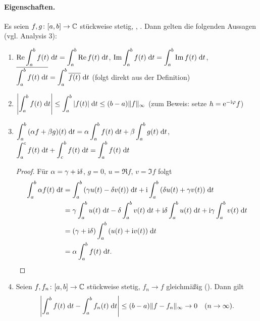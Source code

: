 \documentclass[a4paper,twoside,DIV15,BCOR12mm]{scrbook}
\begin{document}
\paragraph{Eigenschaften.} Es seien $f,g\colon[a,b]\to\mathbb{C}$ stückweise stetig, , \kmplx{\alpha,\beta}. Dann gelten die folgenden Aussagen (vgl. Analysis 3):
\begin{enumerate}
\item $\displaystyle \operatorname{Re}{\int_{a}^{b}{f(t)}\;\mathrm{d} t} = \int_{a}^{b}{\operatorname{Re}{f(t)}}\;\mathrm{d} t$, $\displaystyle \operatorname{Im}{\int_{a}^{b}{f(t)}\;\mathrm{d} t} = \int_{a}^{b}{\operatorname{Im}{f(t)}}\;\mathrm{d} t$, 
$\displaystyle \overline{\int_{a}^{b}{f(t)}\;\mathrm{d} t} = \int_{a}^{b}{\overline{f(t)}}\;\mathrm{d} t$ (folgt direkt aus der Definition)
\item $\displaystyle \left\lvert\int_{a}^{b}{f(t)}\;\mathrm{d} t\right\lvert \le \int_{a}^{b}{\left\lvert f(t)\right\lvert}\;\mathrm{d} t \le (b-a) \|f\|_\infty$ (zum Beweis: setze $h=\mathrm{e}^{-\mathrm{i}\varphi}f$)
\item $\displaystyle \int_{a}^{b}{(\alpha f + \beta g)(t)}\;\mathrm{d} t = \alpha \int_{a}^{b}{f(t)}\;\mathrm{d} t + \beta \int_{a}^{b}{g(t)}\;\mathrm{d} t$,
$\displaystyle \int_{a}^{c}{f(t)}\;\mathrm{d} t + \int_{c}^{b}{f(t)}\;\mathrm{d} t = \int_{a}^{b}{f(t)}\;\mathrm{d} t$
\begin{proof}
Für $\alpha = \gamma + \mathrm{i}\delta$, $g=0$, $u=\Re{f}$, $v=\Im{f}$ folgt
\begin{align*}
\int_{a}^{b}{\alpha f(t)}\;\mathrm{d} t &= \int_{a}^{b}{(\gamma u(t) - \delta v(t))}\;\mathrm{d} t + \mathrm{i} \int_{a}^{b}{(\delta u(t) + \gamma v(t))}\;\mathrm{d} t\\
&= \gamma \int_{a}^{b}{u(t)}\;\mathrm{d} t - \delta \int_{a}^{b}{v(t)}\;\mathrm{d} t + \mathrm{i}\delta \int_{a}^{b}{u(t)}\;\mathrm{d} t + \mathrm{i}\gamma \int_{a}^{b}{v(t)}\;\mathrm{d} t\\
&= (\gamma+\mathrm{i}\delta) \int_{a}^{b}{(u(t)+\mathrm{i} v(t))}\;\mathrm{d} t\\
&= \alpha \int_{a}^{b}{f(t)}\;\mathrm{d} t.\tag*{$\qedhere$}
\end{align*}
\end{proof}
\item Seien $f,f_n\colon[a,b]\to\mathbb{C}$ stückweise stetig, $f_n\to f$ gleichmäßig (\ninf). Dann gilt
\[\left\lvert\int_{a}^{b}{f(t)}\;\mathrm{d} t-\int_{a}^{b}{f_n(t)}\;\mathrm{d} t\right\lvert \le (b-a) \|f-f_n\|_\infty \to 0 \quad (n\rightarrow\infty).\]
\end{enumerate}
\end{document}

